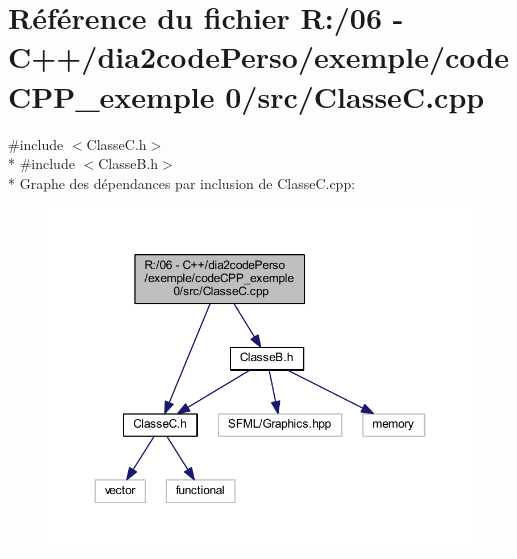 \section{Référence du fichier R\+:/06 -\/ C++/dia2code\+Perso/exemple/code\+C\+P\+P\+\_\+exemple 0/src/\+Classe\+C.cpp}
\label{_classe_c_8cpp}
{\ttfamily \#include $<$Classe\+C.\+h$>$}\\*
{\ttfamily \#include $<$Classe\+B.\+h$>$}\\*
Graphe des dépendances par inclusion de Classe\+C.\+cpp\+:
\nopagebreak
\begin{figure}[H]
\begin{center}
\leavevmode
\includegraphics[width=350pt]{_classe_c_8cpp__incl}
\end{center}
\end{figure}

